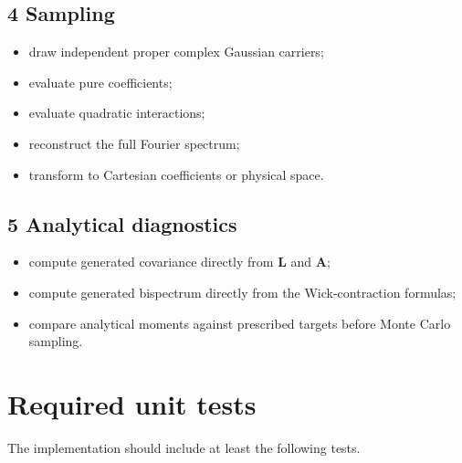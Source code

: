 \documentclass[
  11pt,
  a4paper,
]{article}
\providecommand{\tightlist}{%
  \setlength{\itemsep}{0pt}\setlength{\parskip}{0pt}}
\begin{document}
\subsection{4 Sampling}\label{sampling}

\begin{itemize}
\tightlist
\item
  draw independent proper complex Gaussian carriers;
\item
  evaluate pure coefficients;
\item
  evaluate quadratic interactions;
\item
  reconstruct the full Fourier spectrum;
\item
  transform to Cartesian coefficients or physical space.
\end{itemize}

\subsection{5 Analytical diagnostics}\label{analytical-diagnostics}

\begin{itemize}
\tightlist
\item
  compute generated covariance directly from \(\boldsymbol L\) and
  \(\boldsymbol A\);
\item
  compute generated bispectrum directly from the Wick-contraction
  formulas;
\item
  compare analytical moments against prescribed targets before Monte
  Carlo sampling.
\end{itemize}

\section{Required unit tests}\label{required-unit-tests}

The implementation should include at least the following tests.
\end{document}
